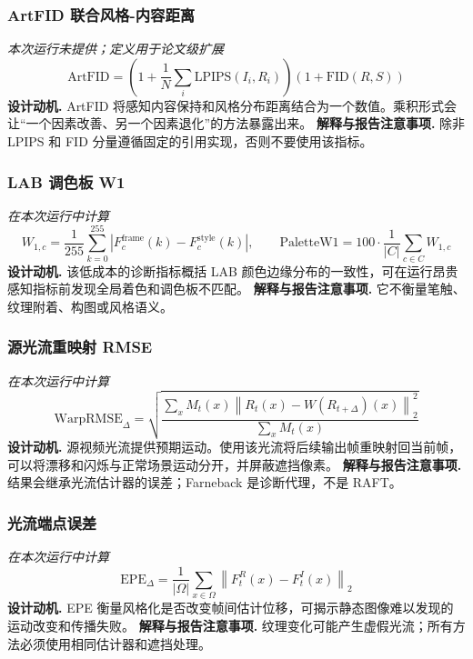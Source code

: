 \documentclass[UTF8,10pt]{ctexart}
\begin{document}
\subsubsection*{ArtFID 联合风格-内容距离}
\textit{本次运行未提供；定义用于论文级扩展}
\begin{equation*}
\mathrm{ArtFID}=\left(1+\frac{1}{N}\sum_i\mathrm{LPIPS}(I_i,R_i)\right)\left(1+\mathrm{FID}(R,S)\right)
\end{equation*}
\textbf{设计动机.} ArtFID 将感知内容保持和风格分布距离结合为一个数值。乘积形式会让“一个因素改善、另一个因素退化”的方法暴露出来。
\textbf{解释与报告注意事项.} 除非 LPIPS 和 FID 分量遵循固定的引用实现，否则不要使用该指标。
\subsubsection*{LAB 调色板 W1}
\textit{在本次运行中计算}
\begin{equation*}
W_{1,c}=\frac{1}{255}\sum_{k=0}^{255}\left|F^{\mathrm{frame}}_c(k)-F^{\mathrm{style}}_c(k)\right|,\qquad \mathrm{PaletteW1}=100\cdot\frac{1}{|C|}\sum_{c\in C}W_{1,c}
\end{equation*}
\textbf{设计动机.} 该低成本的诊断指标概括 LAB 颜色边缘分布的一致性，可在运行昂贵感知指标前发现全局着色和调色板不匹配。
\textbf{解释与报告注意事项.} 它不衡量笔触、纹理附着、构图或风格语义。
\subsubsection*{源光流重映射 RMSE}
\textit{在本次运行中计算}
\begin{equation*}
\mathrm{WarpRMSE}_{\Delta}=\sqrt{\frac{\sum_x M_t(x)\left\|R_t(x)-W(R_{t+\Delta})(x)\right\|_2^2}{\sum_x M_t(x)}}
\end{equation*}
\textbf{设计动机.} 源视频光流提供预期运动。使用该光流将后续输出帧重映射回当前帧，可以将漂移和闪烁与正常场景运动分开，并屏蔽遮挡像素。
\textbf{解释与报告注意事项.} 结果会继承光流估计器的误差；Farneback 是诊断代理，不是 RAFT。
\subsubsection*{光流端点误差}
\textit{在本次运行中计算}
\begin{equation*}
\mathrm{EPE}_{\Delta}=\frac{1}{|\Omega|}\sum_{x\in\Omega}\left\|F^R_t(x)-F^I_t(x)\right\|_2
\end{equation*}
\textbf{设计动机.} EPE 衡量风格化是否改变帧间估计位移，可揭示静态图像难以发现的运动改变和传播失败。
\textbf{解释与报告注意事项.} 纹理变化可能产生虚假光流；所有方法必须使用相同估计器和遮挡处理。
\end{document}

